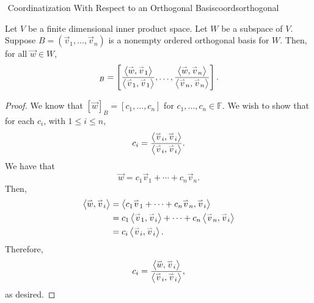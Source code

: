         \begin{theorem}{\Stop\,\,Coordinatization With Respect to an Orthogonal Basis}{coordsorthogonal}

            Let \(V\) be a finite dimensional inner product space. Let \(W\) be a subspace of \(V\). Suppose \(B=(\vec{v}_1,\ldots,\vec{v}_n)\) is a nonempty ordered orthogonal basis for \(W\). Then, for all \(\vec{w}\in W\),
            \begin{equation*}
                [\vec{w}]_B=\left[\frac{\iprod{\vec{w}}{\vec{v}_1}}{\iprod{\vec{v}_1}{\vec{v}_1}},\ldots,\frac{\iprod{\vec{w}}{\vec{v}_n}}{\iprod{\vec{v}_n}{\vec{v}_n}}\right].
            \end{equation*}
            \begin{proof}
                We know that \([\vec{w}]_B=[c_1,\ldots,c_n]\) for \(c_1,\ldots,c_n\in\mathbb{F}\). We wish to show that for each \(c_i\), with \(1\leq i\leq n\),
                \begin{equation*}
                    c_i=\frac{\left\langle \overset{_{\rightharpoonup}}{v}_i,\overset{_{\rightharpoonup}}{v}_i\right\rangle}{\left\langle \overset{_{\rightharpoonup}}{v}_i,\overset{_{\rightharpoonup}}{v}_i\right\rangle}.
                \end{equation*}
                We have that
                \begin{equation*}
                    \vec{w}=c_1\vec{v}_1+\cdots+c_n\vec{v}_n.
                \end{equation*}
                Then,
                \begin{align*}
                    \left\langle \overset{_{\rightharpoonup}}{w},\overset{_{\rightharpoonup}}{v}_i\right\rangle&=\left\langle c_1\overset{_{\rightharpoonup}}{v}_1+\cdots+c_n\overset{_{\rightharpoonup}}{v}_n,\overset{_{\rightharpoonup}}{v}_i\right\rangle \\
                    &=c_1\left\langle \overset{_{\rightharpoonup}}{v}_1,\overset{_{\rightharpoonup}}{v}_i\right\rangle+\cdots+c_n\left\langle \overset{_{\rightharpoonup}}{v}_n,\overset{_{\rightharpoonup}}{v}_i\right\rangle \\
                    &=c_i\left\langle \overset{_{\rightharpoonup}}{v}_i,\overset{_{\rightharpoonup}}{v}_i\right\rangle.
                \end{align*}
                Therefore,
                \begin{equation*}
                    c_i=\frac{\left\langle \overset{_{\rightharpoonup}}{w},\overset{_{\rightharpoonup}}{v}_i\right\rangle}{\left\langle \overset{_{\rightharpoonup}}{v}_i,\overset{_{\rightharpoonup}}{v}_i\right\rangle},
                \end{equation*}
                as desired.
            \end{proof}
        \end{theorem}
